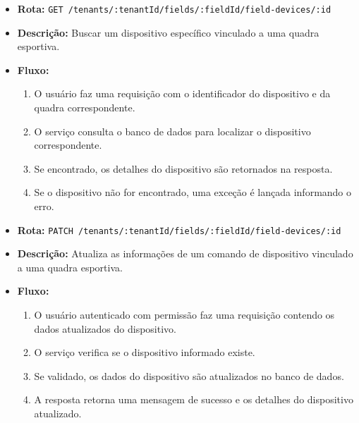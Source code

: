 \begin{itemize}
\item \textbf{Rota:} \texttt{GET /tenants/:tenantId/fields/:fieldId/field-devices/:id}
\item \textbf{Descrição:} Buscar um dispositivo específico vinculado a uma quadra esportiva.
\item \textbf{Fluxo:}
\begin{enumerate}
\item O usuário faz uma requisição com o identificador do dispositivo e da quadra correspondente.
\item O serviço consulta o banco de dados para localizar o dispositivo correspondente.
\item Se encontrado, os detalhes do dispositivo são retornados na resposta.
\item Se o dispositivo não for encontrado, uma exceção é lançada informando o erro.
\end{enumerate}
\end{itemize}

\begin{itemize}
\item \textbf{Rota:} \texttt{PATCH /tenants/:tenantId/fields/:fieldId/field-devices/:id}
\item \textbf{Descrição:} Atualiza as informações de um comando de dispositivo vinculado a uma quadra esportiva.
\item \textbf{Fluxo:}
\begin{enumerate}
\item O usuário autenticado com permissão faz uma requisição contendo os dados atualizados do dispositivo.
\item O serviço verifica se o dispositivo informado existe.
\item Se validado, os dados do dispositivo são atualizados no banco de dados.
\item A resposta retorna uma mensagem de sucesso e os detalhes do dispositivo atualizado.
\end{enumerate}
\end{itemize}

